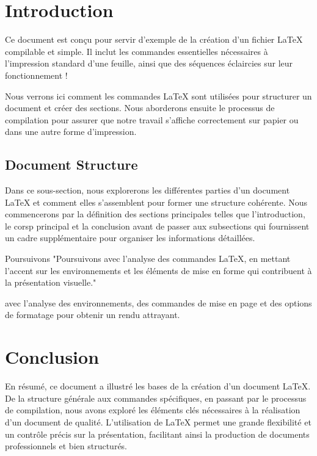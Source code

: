 \documentclass{article}
\begin{document}


\section{Introduction}
Ce document est conçu pour servir d'exemple de la création d'un fichier LaTeX compilable et simple. Il inclut les commandes essentielles nécessaires à l’impression standard d'une feuille, ainsi que des séquences éclaircies sur leur fonctionnement !

Nous verrons ici comment les commandes LaTeX sont utilisées pour structurer un document et créer des sections. Nous aborderons ensuite le processus de compilation pour assurer que notre travail s'affiche correctement sur papier ou dans une autre forme d'impression.

\subsection{Document Structure} 

Dans ce sous-section, nous explorerons les différentes parties d’un document LaTeX et comment elles s'assemblent pour former une structure cohérente. Nous commencerons par la définition des sections principales telles que l'introduction, le corsp principal et la conclusion avant de passer aux subsections qui fournissent un cadre supplémentaire pour organiser les informations détaillées.

Poursuivons "Poursuivons avec l'analyse des commandes LaTeX, en mettant l'accent sur les environnements et les éléments de mise en forme qui contribuent à la présentation visuelle."

avec l'analyse des environnements, des commandes de mise en page et des options de formatage pour obtenir un rendu attrayant.

\section{Conclusion}
En résumé, ce document a illustré les bases de la création d'un document LaTeX. De la structure générale aux commandes spécifiques, en passant par le processus de compilation, nous avons exploré les éléments clés nécessaires à la réalisation d'un document de qualité. L'utilisation de LaTeX permet une grande flexibilité et un contrôle précis sur la présentation, facilitant ainsi la production de documents professionnels et bien structurés.
\end{document}
